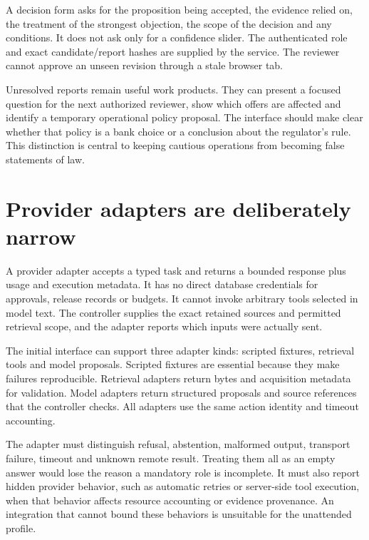 A decision form asks for the proposition being accepted, the evidence relied on,
the treatment of the strongest objection, the scope of the decision and any
conditions. It does not ask only for a confidence slider. The authenticated role
and exact candidate/report hashes are supplied by the service. The reviewer
cannot approve an unseen revision through a stale browser tab.

Unresolved reports remain useful work products. They can present a focused
question for the next authorized reviewer, show which offers are affected and
identify a temporary operational policy proposal. The interface should make clear
whether that policy is a bank choice or a conclusion about the regulator's rule.
This distinction is central to keeping cautious operations from becoming false
statements of law.

\section{Provider adapters are deliberately narrow}
\label{merge:M08:09}


A provider adapter accepts a typed task and returns a bounded response plus usage
and execution metadata. It has no direct database credentials for approvals,
release records or budgets. It cannot invoke arbitrary tools selected in model
text. The controller supplies the exact retained sources and permitted retrieval
scope, and the adapter reports which inputs were actually sent.

The initial interface can support three adapter kinds: scripted fixtures,
retrieval tools and model proposals. Scripted fixtures are essential because they
make failures reproducible. Retrieval adapters return bytes and acquisition
metadata for validation. Model adapters return structured proposals and source
references that the controller checks. All adapters use the same action identity
and timeout accounting.


The adapter must distinguish refusal, abstention, malformed output, transport
failure, timeout and unknown remote result. Treating them all as an empty answer
would lose the reason a mandatory role is incomplete. It must also report hidden
provider behavior, such as automatic retries or server-side tool execution, when
that behavior affects resource accounting or evidence provenance. An integration
that cannot bound these behaviors is unsuitable for the unattended profile.

